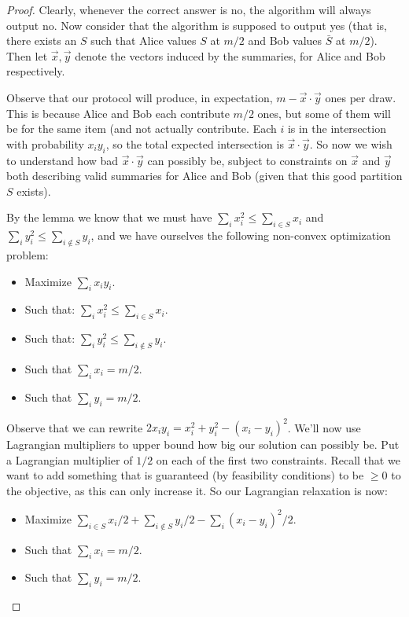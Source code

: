 \begin{proof}
Clearly, whenever the correct answer is no, the algorithm will always output no. Now consider that the algorithm is supposed to output yes (that is, there exists an $S$ such that Alice values $S$ at $m/2$ and Bob values $\bar{S}$ at $m/2$). Then let $\vec{x}, \vec{y}$ denote the vectors induced by the summaries, for Alice and Bob respectively.

Observe that our protocol will produce, in expectation, $m - \vec{x} \cdot \vec{y}$ ones per draw. This is because Alice and Bob each contribute $m/2$ ones, but some of them will be for the same item (and not actually contribute. Each $i$ is in the intersection with probability $x_i y_i$, so the total expected intersection is $\vec{x} \cdot \vec{y}$. So now we wish to understand how bad $\vec{x} \cdot \vec{y}$ can possibly be, subject to constraints on $\vec{x}$ and $\vec{y}$ both describing valid summaries for Alice and Bob (given that this good partition $S$ exists).

By the lemma we know that we must have $\sum_i x_i^2 \leq \sum_{i \in S} x_i$ and $\sum_i y_i^2 \leq \sum_{i \notin S} y_i$, and we have ourselves the following non-convex optimization problem:

\begin{itemize}
\item Maximize $\sum_i x_i y_i$.
\item Such that: $\sum_i x_i^2 \leq \sum_{i \in S} x_i$.
\item Such that: $\sum_i y_i^2 \leq \sum_{i \notin S} y_i$.
\item Such that $\sum_i x_i = m/2$.
\item Such that $\sum_i y_i = m/2$.
\end{itemize}

Observe that we can rewrite $2x_i y_i = x_i^2 +y_i^2 - (x_i-y_i)^2$. We'll now use Lagrangian multipliers to upper bound how big our solution can possibly be. Put a Lagrangian multiplier of $1/2$ on each of the first two constraints. Recall that we want to add something that is guaranteed (by feasibility conditions) to be $\geq 0$ to the objective, as this can only increase it. So our Lagrangian relaxation is now:

\begin{itemize}
\item Maximize $\sum_{i \in S} x_i/2 + \sum_{i \notin S} y_i/2 - \sum_i (x_i-y_i)^2/2$.
\item Such that $\sum_i x_i = m/2$.
\item Such that $\sum_i y_i = m/2$.
\end{itemize}


\end{proof}
